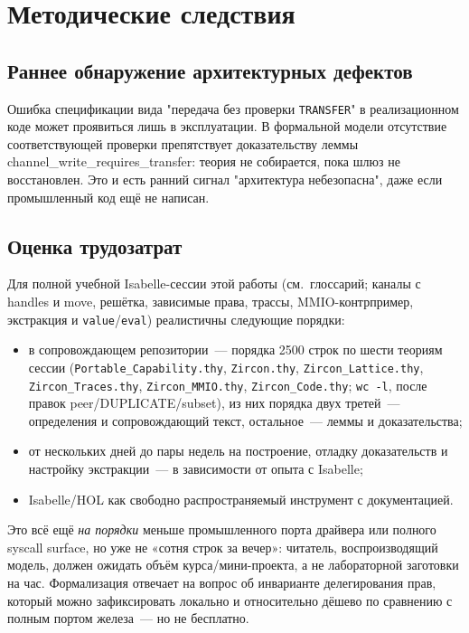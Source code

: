 \documentclass[11pt,a4paper]{article}
\newcommand{\isabel}[1]{{\isabelleit #1}}
\newcommand{\lemmaname}[1]{\isabel{#1}}
\begin{document}
\section{Методические следствия}

\subsection{Раннее обнаружение архитектурных дефектов}

Ошибка спецификации вида "передача без проверки \texttt{TRANSFER}" в
реализационном коде может проявиться лишь в эксплуатации. В формальной
модели отсутствие соответствующей проверки препятствует доказательству
леммы \lemmaname{channel\_write\_requires\_transfer}: теория не
собирается, пока шлюз не восстановлен. Это и есть ранний сигнал
"архитектура небезопасна", даже если промышленный код ещё не написан.

\subsection{Оценка трудозатрат}

Для полной учебной Isabelle-сессии этой работы (см.\ глоссарий;
каналы с handles и move, решётка, зависимые права, трассы,
MMIO-контрпример, экстракция и \texttt{value}/\texttt{eval})
реалистичны следующие порядки:
\begin{itemize}[leftmargin=1.4em]
	\item в сопровождающем репозитории~--- порядка 2500 строк по шести
	      теориям сессии
	      (\texttt{Portable\_Capability.thy}, \texttt{Zircon.thy},
	      \texttt{Zircon\_Lattice.thy}, \texttt{Zircon\_Traces.thy},
	      \texttt{Zircon\_MMIO.thy}, \texttt{Zircon\_Code.thy};
	      \texttt{wc -l}, после правок peer/DUPLICATE/subset), из них
	      порядка двух третей~--- определения и сопровождающий текст,
	      остальное~--- леммы и доказательства;
	\item от нескольких дней до пары недель на построение, отладку
	      доказательств и настройку экстракции~--- в зависимости от опыта
	      с Isabelle;
	\item Isabelle/HOL как свободно распространяемый инструмент с
	      документацией.
\end{itemize}
Это всё ещё \emph{на порядки} меньше промышленного порта драйвера или
полного syscall surface, но уже не «сотня строк за вечер»: читатель,
воспроизводящий модель, должен ожидать объём курса/мини-проекта, а не
лабораторной заготовки на час. Формализация отвечает на вопрос об
инварианте делегирования прав, который можно зафиксировать локально и
относительно дёшево по сравнению с полным портом железа~--- но не
бесплатно.
\end{document}
